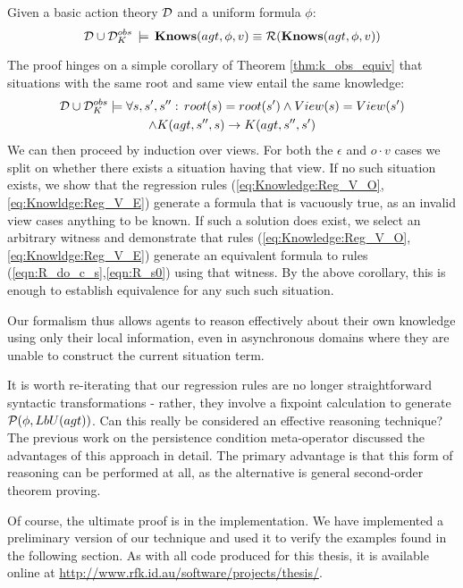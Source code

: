 \begin{thm}
\label{thm:Reg_KnowsO}Given a basic action theory $\mathcal{D}$ and a uniform
formula $\phi$:\[
\mathcal{D}\cup\mathcal{D}_{K}^{obs}\,\models\,\mathbf{Knows}(agt,\phi,v)\equiv\mathcal{R}(\mathbf{Knows}(agt,\phi,v))\]

\end{thm}
\begin{proofsketch}
The proof hinges on a simple corollary of Theorem \ref{thm:k_obs_equiv}
that situations with the same root and same view entail the same knowledge:\begin{multline*}
\mathcal{D}\cup\mathcal{D}_{K}^{obs}\models\forall s,s',s'':\, root(s)=root(s')\wedge View(s)=View(s')\\
\wedge K(agt,s'',s)\rightarrow K(agt,s'',s')\end{multline*}
 We can then proceed by induction over views. For both the $\epsilon$
and $o\cdot v$ cases we split on whether there exists a situation
having that view. If no such situation exists, we show that the regression
rules (\ref{eq:Knowledge:Reg_V_O}, \ref{eq:Knowldge:Reg_V_E}) generate
a formula that is vacuously true, as an invalid view cases anything
to be known. If such a solution does exist, we select an arbitrary
witness and demonstrate that rules (\ref{eq:Knowledge:Reg_V_O}, \ref{eq:Knowldge:Reg_V_E})
generate an equivalent formula to rules (\ref{eqn:R_do_c_s},\ref{eqn:R_s0})
using that witness. By the above corollary, this is enough to establish
equivalence for any such such situation. 
\end{proofsketch}
Our formalism thus allows agents to reason effectively about their
own knowledge using only their local information, even in asynchronous
domains where they are unable to construct the current situation term.

It is worth re-iterating that our regression rules are no longer straightforward
syntactic transformations - rather, they involve a fixpoint calculation
to generate $\mathcal{P}(\phi,LbU(agt))$. Can this really be considered
an effective reasoning technique? The previous work on the persistence
condition meta-operator discussed the advantages of this approach
in detail. The primary advantage is that this form of reasoning can
be performed at all, as the alternative is general second-order theorem
proving.

Of course, the ultimate proof is in the implementation. We have implemented
a preliminary version of our technique and used it to verify the examples
found in the following section. As with all code produced for this
thesis, it is available online at \url{http://www.rfk.id.au/software/projects/thesis/}.

